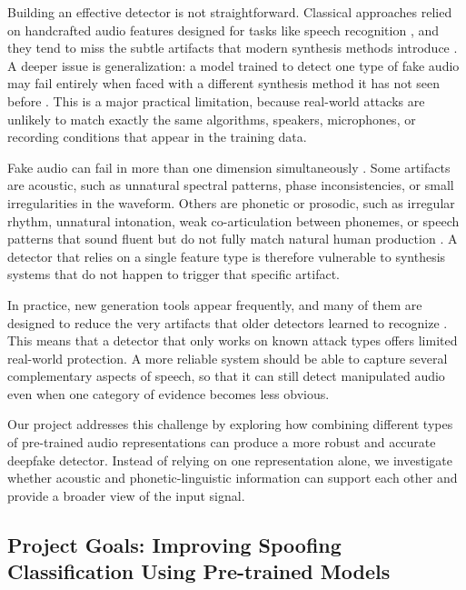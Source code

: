 \documentclass[11pt,a4paper]{article}
\begin{document}
Building an effective detector is not straightforward. Classical approaches
relied on handcrafted audio features designed for tasks like speech recognition
\cite{todisco2017cqcc}, and they tend to miss the subtle artifacts that modern
synthesis methods introduce \cite{li2024survey,yi2023survey}. A deeper issue is
generalization: a model trained to detect one type of fake audio may fail entirely
when faced with a different synthesis method it has not seen before
\cite{muller2024harder}. This is a major practical limitation, because real-world
attacks are unlikely to match exactly the same algorithms, speakers, microphones,
or recording conditions that appear in the training data.

Fake audio can fail in more than one dimension simultaneously
\cite{li2024survey,yi2023survey}. Some artifacts are acoustic, such as unnatural
spectral patterns, phase inconsistencies, or small irregularities in the waveform.
Others are phonetic or prosodic, such as irregular rhythm, unnatural intonation,
weak co-articulation between phonemes, or speech patterns that sound fluent but do
not fully match natural human production \cite{nguyen2025linguistic,zhu2024slim}.
A detector that relies on a single feature type is therefore vulnerable to
synthesis systems that do not happen to trigger that specific artifact.

In practice, new generation tools appear frequently, and many of them are designed
to reduce the very artifacts that older detectors learned to recognize
\cite{shi2025benchmarking,muller2024harder}. This means that a detector that only
works on known attack types offers limited real-world protection. A more reliable
system should be able to capture several complementary aspects of speech, so that
it can still detect manipulated audio even when one category of evidence becomes
less obvious.

Our project addresses this challenge by exploring how combining different types of
pre-trained audio representations can produce a more robust and accurate deepfake
detector. Instead of relying on one representation alone, we investigate whether
acoustic and phonetic-linguistic information can support each other and provide a
broader view of the input signal.

\subsection{Project Goals: Improving Spoofing Classification Using Pre-trained Models}
\end{document}
